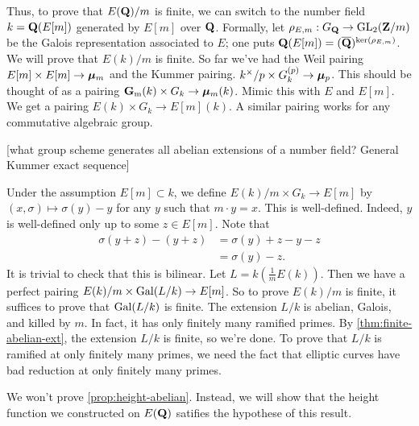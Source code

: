 Thus, to prove that $E(\mathbf{Q})/m$ is finite, we can switch to the number field 
$k=\mathbf{Q}(E[m])$ generated by $E[m]$ over $\mathbf{Q}$. Formally, let 
$\rho_{E,m}:G_{\mathbf{Q}}\to \operatorname{GL}_2(\mathbf{Z}/m)$ be the Galois representation associated 
to $E$; one puts $\mathbf{Q}(E[m])=(\overline{\mathbf{Q}})^{\ker(\rho_{E,m})}$. We will prove 
that $E(k)/m$ is finite. So far we've had the Weil pairing 
$E[m]\times E[m]\to {\bm\mu}_m$ and the Kummer pairing. 
$k^\times/p\times G_k^{(p)}\to {\bm\mu}_p$. This should be thought of as a pairing 
$\mathbf{G}_\mathrm{m}(k)\times G_k\to {\bm\mu}_m(k)$. Mimic this with $E$ and $E[m]$. We get a 
pairing $E(k)\times G_k\to E[m](k)$. A similar pairing works for any 
commutative algebraic group. 

[what group scheme generates all abelian extensions of a number field?
General Kummer exact sequence]

Under the assumption $E[m]\subset k$, we define $E(k)/m\times G_k\to E[m]$ by 
$(x,\sigma)\mapsto \sigma(y)-y$ for any $y$ such that $m\cdot y=x$. 
This is well-defined. Indeed, $y$ is well-defined only up to some 
$z\in E[m]$. Note that 
\begin{align*}
  \sigma(y+z)-(y+z) 
    &= \sigma(y)+z-y-z \\
    &= \sigma(y)-z .
\end{align*}
It is trivial to check that this is bilinear. Let $L=k(\frac 1 m E(k))$. Then 
we have a perfect pairing $E(k)/m\times \operatorname{Gal}(L/k)\to E[m]$. So to prove 
$E(k)/m$ is finite, it suffices to prove that $\operatorname{Gal}(L/k)$ is finite. The 
extension $L/k$ is abelian, Galois, and killed by $m$. In fact, it has only 
finitely many ramified primes. By \autoref{thm:finite-abelian-ext}, the 
extension $L/k$ is finite, so we're done. To prove that $L/k$ is ramified 
at only finitely many primes, we need the fact that elliptic curves have 
bad reduction at only finitely many primes. 

We won't prove \autoref{prop:height-abelian}. Instead, we will show that the 
height function we constructed on $E(\mathbf{Q})$ satifies the hypothese of this 
result. 




